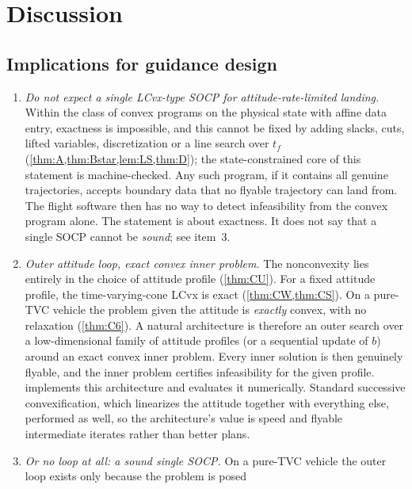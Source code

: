 \section{Discussion}\label{sec:discussion}

\subsection{Implications for guidance design}
\begin{enumerate}[leftmargin=*,itemsep=3pt]
\item \emph{Do not expect a single LCvx-type SOCP for attitude-rate-limited landing.} Within the class of convex programs on the
physical state with affine data entry, exactness is impossible, and this cannot be fixed by adding slacks, cuts, lifted
variables, discretization or a line search over $t_f$ (\cref{thm:A,thm:Bstar,lem:LS,thm:D}); the state-constrained core of this statement is machine-checked. Any such program, if it contains all
genuine trajectories, accepts boundary data that no flyable trajectory can land from. The flight software then has no way to
detect infeasibility from the convex program alone. The statement is about exactness. It does not say that a single SOCP cannot be
\emph{sound}; see item~3.
\item \emph{Outer attitude loop, exact convex inner problem.} The nonconvexity lies entirely in the choice of attitude profile
(\cref{thm:CU}). For a fixed attitude profile, the time-varying-cone LCvx is exact (\cref{thm:CW,thm:CS}). On a pure-TVC vehicle the
problem given the attitude is \emph{exactly} convex, with no relaxation (\cref{thm:C6}). A natural architecture is therefore an
outer search over a low-dimensional family of attitude profiles (or a sequential update of $b$) around an exact convex inner
problem. Every inner solution is then genuinely flyable, and the inner problem certifies infeasibility for the given profile.
 implements this architecture and evaluates it numerically. Standard successive convexification, which
linearizes the attitude together with everything else, performed as well, so the architecture's value is speed and flyable
intermediate iterates rather than better plans.
\item \emph{Or no loop at all: a sound single SOCP.} On a pure-TVC vehicle the outer loop exists only because the problem is posed

\end{enumerate}
